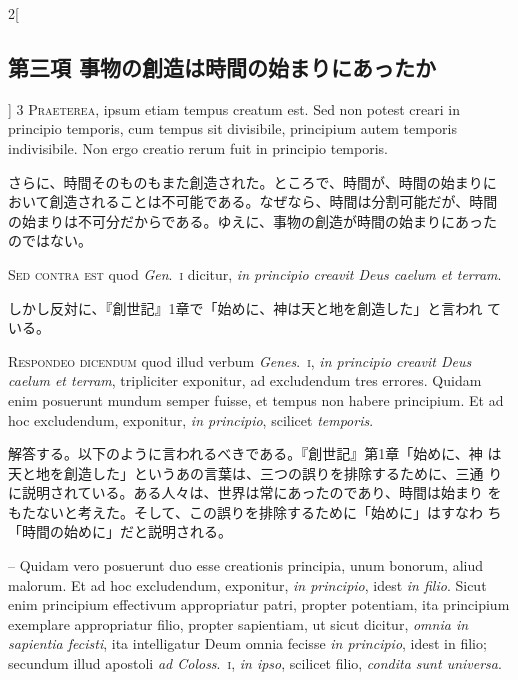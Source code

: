 \documentclass[paper=a4paper,fontsize=10pt,jafontsize=9pt,titlepage]{jlreq}
\begin{document}
\begin{paracol}{2}[\subsection{第三項 事物の創造は時間の始まりにあったか}]
{\scshape 3 Praeterea}, ipsum etiam tempus creatum
est. Sed non potest creari in principio temporis, cum tempus sit
divisibile, principium autem temporis indivisibile. Non ergo creatio
rerum fuit in principio temporis.


\switchcolumn


さらに、時間そのものもまた創造された。ところで、時間が、時間の始まりに
おいて創造されることは不可能である。なぜなら、時間は分割可能だが、時間
の始まりは不可分だからである。ゆえに、事物の創造が時間の始まりにあった
のではない。


\switchcolumn*[\subsection{s.c.}]


{\scshape Sed contra est} quod {\itshape Gen}.~{\scshape i} dicitur,
{\itshape in principio creavit Deus caelum et terram}.


\switchcolumn


しかし反対に、『創世記』1章で「始めに、神は天と地を創造した」と言われ
ている。




{\scshape Respondeo dicendum} quod illud verbum {\itshape
Genes}.~{\scshape i}, {\itshape in principio creavit Deus caelum et
terram}, tripliciter exponitur, ad excludendum tres errores. Quidam enim
posuerunt mundum semper fuisse, et tempus non habere principium. Et ad
hoc excludendum, exponitur, {\itshape in principio}, scilicet {\itshape
temporis}.


\switchcolumn


解答する。以下のように言われるべきである。『創世記』第1章「始めに、神
は天と地を創造した」というあの言葉は、三つの誤りを排除するために、三通
りに説明されている。ある人々は、世界は常にあったのであり、時間は始まり
をもたないと考えた。そして、この誤りを排除するために「始めに」はすなわ
ち「時間の始めに」だと説明される。


\switchcolumn*


-- Quidam vero posuerunt duo esse creationis principia, unum bonorum,
aliud malorum. Et ad hoc excludendum, exponitur, {\itshape in
principio}, idest {\itshape in filio}. Sicut enim principium effectivum
appropriatur patri, propter potentiam, ita principium exemplare
appropriatur filio, propter sapientiam, ut sicut dicitur, {\itshape
omnia in sapientia fecisti}, ita intelligatur Deum omnia fecisse
{\itshape in principio}, idest in filio; secundum illud apostoli
{\itshape ad Coloss}.~{\scshape i}, {\itshape in ipso}, scilicet filio,
{\itshape condita sunt universa}.



\end{paracol}
\end{document}

